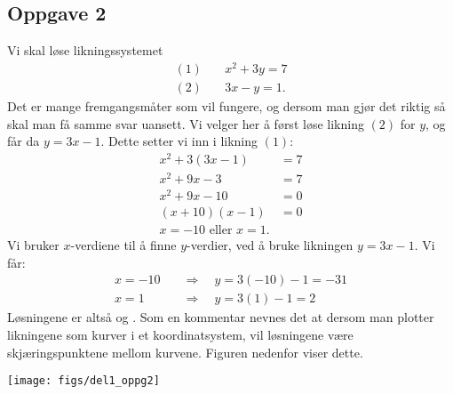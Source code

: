 \subsection*{Oppgave 2}
Vi skal løse likningssystemet
\begin{align*}
	(1) \quad & x^2 + 3y = 7 \\	
	(2) \quad & 3x - y = 1.
\end{align*}
Det er mange fremgangsmåter som vil fungere, og dersom man gjør det riktig så skal man få samme svar uansett. Vi velger her å først løse likning $(2)$ for $y$, og får da $y = 3x - 1$.
Dette setter vi inn i likning $(1)$:
\begin{align*}
	x^2 + 3 \left( 3x - 1\right) &= 7 \\
	x^2 + 9x - 3 &= 7 \\
	x^2 + 9x - 10 &= 0 \\
	(x + 10)(x - 1) &= 0 \\
	x = -10 \text{ eller } x = 1.
\end{align*}
Vi bruker $x$-verdiene til å finne $y$-verdier, ved å bruke likningen $y = 3x - 1$. Vi får:
\begin{align*}
	x = -10 \quad & \Rightarrow \quad y = 3(-10) - 1 = -31 \\
	x = 1 \quad \ \quad & \Rightarrow \quad y = 3(1) - 1 = 2
\end{align*}
Løsningene er altså  og . Som en kommentar nevnes det at dersom man plotter likningene som kurver i et koordinatsystem, vil løsningene være skjæringspunktene mellom kurvene. 
Figuren nedenfor viser dette.

\begin{center}
	\texttt{[image: figs/del1\_oppg2]}
\end{center}

